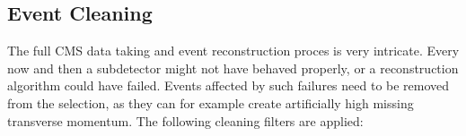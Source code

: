 % 






\subsection{Event Cleaning \label{sec:event_cleaning}}

The full CMS data taking and event reconstruction proces is very intricate. Every now and then a
subdetector might not have behaved properly, or a reconstruction algorithm could have failed. 
Events affected by such failures need to be removed from the selection, as they can for example
create artificially high missing transverse momentum.
The following cleaning filters are applied:

